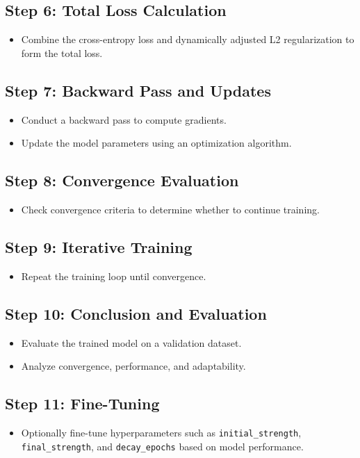 \documentclass{article}
\begin{document}
\subsection*{Step 6: Total Loss Calculation}
\begin{itemize}
    \item Combine the cross-entropy loss and dynamically adjusted L2 regularization to form the total loss.
\end{itemize}

\subsection*{Step 7: Backward Pass and Updates}
\begin{itemize}
    \item Conduct a backward pass to compute gradients.
    \item Update the model parameters using an optimization algorithm.
\end{itemize}

\subsection*{Step 8: Convergence Evaluation}
\begin{itemize}
    \item Check convergence criteria to determine whether to continue training.
\end{itemize}

\subsection*{Step 9: Iterative Training}
\begin{itemize}
    \item Repeat the training loop until convergence.
\end{itemize}

\subsection*{Step 10: Conclusion and Evaluation}
\begin{itemize}
    \item Evaluate the trained model on a validation dataset.
    \item Analyze convergence, performance, and adaptability.
\end{itemize}

\subsection*{Step 11: Fine-Tuning}
\begin{itemize}
    \item Optionally fine-tune hyperparameters such as \texttt{initial\_strength}, \texttt{final\_strength}, and \texttt{decay\_epochs} based on model performance.
\end{itemize}
\end{document}
